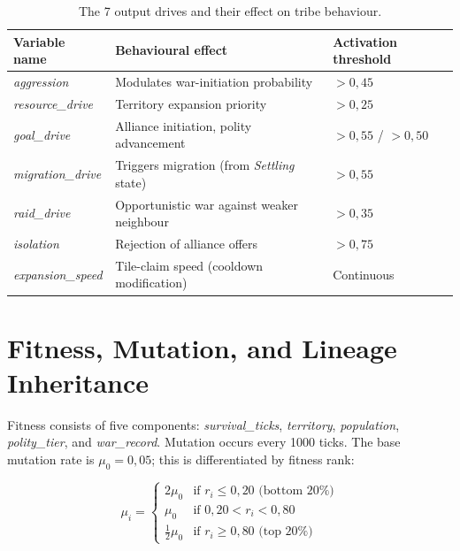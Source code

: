 \begin{table}[h]
  \centering
  \caption{The 7 output drives and their effect on tribe behaviour.}
  \label{tab:neurosim-outputs}
  \begin{tabular}{|l|l|l|}
    \hline
    \textbf{Variable name} & \textbf{Behavioural effect} & \textbf{Activation threshold} \\
    \hline
    \textit{aggression}      & Modulates war-initiation probability            & $> 0{,}45$ \\
    \textit{resource\_drive} & Territory expansion priority                     & $> 0{,}25$ \\
    \textit{goal\_drive}     & Alliance initiation, polity advancement          & $> 0{,}55$ / $> 0{,}50$ \\
    \textit{migration\_drive}& Triggers migration (from \textit{Settling} state) & $> 0{,}55$ \\
    \textit{raid\_drive}     & Opportunistic war against weaker neighbour      & $> 0{,}35$ \\
    \textit{isolation}       & Rejection of alliance offers                     & $> 0{,}75$ \\
    \textit{expansion\_speed}& Tile-claim speed (cooldown modification)         & Continuous \\
    \hline
  \end{tabular}
\end{table}

\section{Fitness, Mutation, and Lineage Inheritance}

Fitness consists of five components: \textit{survival\_ticks}, \textit{territory}, \textit{population}, \textit{polity\_tier}, and \textit{war\_record}. Mutation occurs every 1000 ticks. The base mutation rate is $\mu_0 = 0{,}05$; this is differentiated by fitness rank:

\begin{equation}
\mu_i =
\begin{cases}
2\mu_0 & \text{if } r_i \leq 0{,}20 \text{ (bottom 20\%)} \\
\mu_0  & \text{if } 0{,}20 < r_i < 0{,}80 \\
\tfrac{1}{2}\mu_0 & \text{if } r_i \geq 0{,}80 \text{ (top 20\%)}
\end{cases}
\end{equation}

